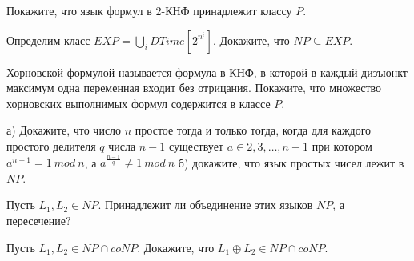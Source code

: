 \setcounter{curtask}{1}


\begin{task}
    Покажите, что язык формул в 2-КНФ принадлежит классу $P$.
\end{task}

\begin{task}
    Определим класс $EXP = \bigcup\limits_{i}DTime[2^{n^i}]$. Докажите, что
    $NP \subseteq EXP$.
\end{task}

\begin{task}
    Хорновской формулой называется формула в КНФ, в которой в каждый дизъюнкт
    максимум одна переменная входит без отрицания. Покажите, что множество
    хорновских выполнимых формул содержится в классе $P$.
\end{task}

\begin{task}
    а) Докажите, что число $n$ простое тогда и только тогда, когда для каждого
    простого делителя $q$ числа $n - 1$ существует $a \in {2, 3, \dots, n - 1}$ при котором
    $a^{n - 1} = 1~mod~n$, а $a^{\frac{n - 1}{q}} \ne 1~mod~n$
    б) докажите, что язык простых чисел лежит в $NP$.
\end{task}

\begin{task}
    Пусть $L_1, L_2 \in NP$. Принадлежит ли объединение этих языков $NP$, а пересечение?
\end{task}

\begin{task}
    Пусть $L_1, L_2 \in NP \cap coNP$. Докажите, что $L_1 \oplus L_2 \in NP \cap coNP$.
\end{task}
